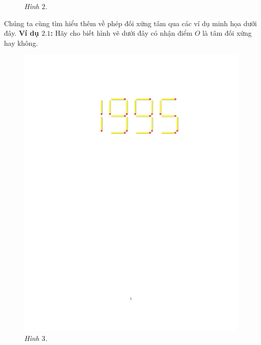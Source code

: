 \begin{multicols}{2}
\begin{figure}[H]
		\caption{\small\textit{\color{toancuabi}Hình $2$.}}
		\vspace*{-10pt}
	\end{figure}
	Chúng ta cùng tìm hiểu thêm về phép đối xứng tâm qua các ví dụ minh họa dưới đây.
	\textbf{\color{toancuabi}Ví dụ $\pmb{2.1}$:} Hãy cho biết hình vẽ dưới đây có nhận điểm $O$ là tâm đối xứng hay không. 
	\begin{figure}[H]
		\vspace*{-5pt}
		\centering
		\captionsetup{labelformat= empty, justification=centering}
		\includegraphics[width= 0.65\linewidth]{3}
		\caption{\small\textit{\color{toancuabi}Hình $3$.}}
		\vspace*{-5pt}
	\end{figure}
	\end{multicols}
